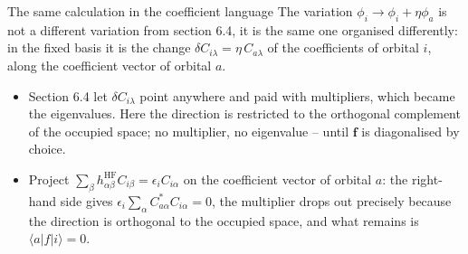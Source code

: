 \documentclass[aspectratio=169,10pt]{beamer}
\newcommand{\element}[3]{\langle #1\vert #2\vert #3\rangle}
\begin{document}
\begin{frame}{The same calculation in the coefficient language}
  \small
    The variation $\phi_i\to\phi_i+\eta\phi_a$ is not a different variation from section 6.4, it is the same one organised differently: in the fixed basis it is the change $\delta C_{i\lambda}=\eta\,C_{a\lambda}$ of the coefficients of orbital $i$, along the coefficient vector of orbital $a$.
    \begin{itemize}
      \item Section 6.4 let $\delta C_{i\lambda}$ point anywhere and paid with multipliers, which became the eigenvalues. Here the direction is restricted to the orthogonal complement of the occupied space; no multiplier, no eigenvalue -- until $\bm{f}$ is diagonalised by choice.
      \item Project $\sum_\beta h^{\mathrm{HF}}_{\alpha\beta}C_{i\beta}=\epsilon_iC_{i\alpha}$ on the coefficient vector of orbital $a$: the right-hand side gives $\epsilon_i\sum_\alpha C^{*}_{a\alpha}C_{i\alpha}=0$, the multiplier drops out precisely because the direction is orthogonal to the occupied space, and what remains is $\element{a}{\hat{f}}{i}=0$.
    \end{itemize}
\end{frame}
\end{document}
